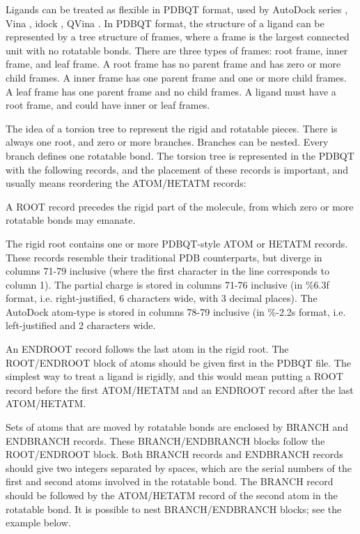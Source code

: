 Ligands can be treated as flexible in PDBQT format, used by AutoDock series \cite{597,596}, Vina \cite{595}, idock \cite{1153}, QVina \cite{1193}. In PDBQT format, the structure of a ligand can be represented by a tree structure of frames, where a frame is the largest connected unit with no rotatable bonds. There are three types of frames: root frame, inner frame, and leaf frame. A root frame has no parent frame and has zero or more child frames. A inner frame has one parent frame and one or more child frames. A leaf frame has one parent frame and no child frames. A ligand must have a root frame, and could have inner or leaf frames.

The idea of a torsion tree to represent the rigid and rotatable pieces. There is always one root, and zero or more branches. Branches can be nested. Every branch defines one rotatable bond. The torsion tree is represented in the PDBQT with the following records, and the placement of these records is important, and usually means reordering the ATOM/HETATM records: %

A ROOT record precedes the rigid part of the molecule, from which zero or more rotatable bonds may emanate.

The rigid root contains one or more PDBQT-style ATOM or HETATM records. These records resemble their traditional PDB counterparts, but diverge in columns 71-79 inclusive (where the first character in the line corresponds to column 1). The partial charge is stored in columns 71-76 inclusive (in \%6.3f format, i.e. right-justified, 6 characters wide, with 3 decimal places). The AutoDock atom-type is stored in columns 78-79 inclusive (in \%-2.2s format, i.e. left-justified and 2 characters wide.

An ENDROOT record follows the last atom in the rigid root. The ROOT/ENDROOT block of atoms should be given first in the PDBQT file. The simplest way to treat a ligand is rigidly, and this would mean putting a ROOT record before the first ATOM/HETATM and an ENDROOT record after the last ATOM/HETATM.

Sets of atoms that are moved by rotatable bonds are enclosed by BRANCH and ENDBRANCH records. These BRANCH/ENDBRANCH blocks follow the ROOT/ENDROOT block. Both BRANCH records and ENDBRANCH records should give two integers separated by spaces, which are the serial numbers of the first and second atoms involved in the rotatable bond. The BRANCH record should be followed by the ATOM/HETATM record of the second atom in the rotatable bond. It is possible to nest BRANCH/ENDBRANCH blocks; see the example below.

